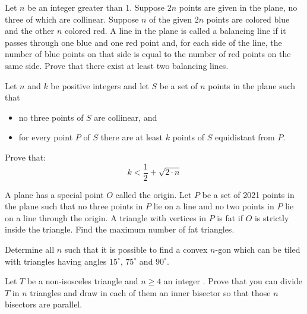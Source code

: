 \documentclass[11pt]{scrartcl}
\begin{document}
\begin{problem} %
    Let $n$ be an integer greater than 1. Suppose $2n$ points are given in the plane, no three of which are collinear. Suppose $n$ of the given $2n$ points are colored blue and the other $n$ colored red. A line in the plane is called a balancing line if it passes through one blue and one red point and, for each side of the line, the number of blue points on that side is equal to the number of red points on the same side.
Prove that there exist at least two balancing lines.
\end{problem}

\begin{problem} %
    Let $ n$ and $ k$ be positive integers and let $ S$ be a set of $ n$ points in the plane such that
\begin{itemize}
   
\item no three points of $ S$ are collinear, and

\item for every point $ P$ of $ S$ there are at least $ k$ points of $ S$ equidistant from $ P.$
 
\end{itemize}
Prove that:
\[ k < \frac {1}{2} + \sqrt {2 \cdot n}
\]
\end{problem}

\begin{problem} %
    A plane has a special point $O$ called the origin. Let $P$ be a set of 2021 points in the plane such that
no three points in $P$ lie on a line and
no two points in $P$ lie on a line through the origin.
A triangle with vertices in $P$ is fat if $O$ is strictly inside the triangle. Find the maximum number of fat triangles.
\end{problem}

\begin{problem} %
    Determine all $n$ such that it is possible to find a convex $n$-gon which can be tiled with triangles having angles $15^\circ$, $75^\circ$ and $90^\circ$.
\end{problem}

\begin{problem} %
    	Let $T$ be a non-isosceles triangle and $n \ge 4$ an integer . Prove that you can divide $T$ in $n$ triangles and draw in each of them an inner bisector so that those $n$ bisectors are parallel.
\end{problem}
\end{document}
